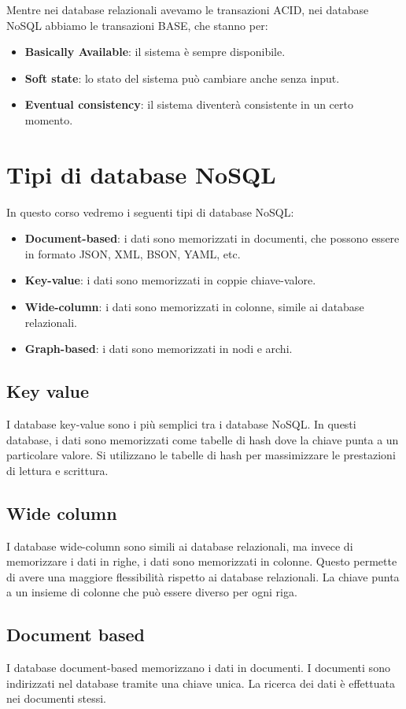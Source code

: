 Mentre nei database relazionali avevamo le transazioni ACID, nei database NoSQL
abbiamo le transazioni BASE, che stanno per:
\begin{itemize}
      \item \textbf{Basically Available}: il sistema è sempre disponibile.
      \item \textbf{Soft state}: lo stato del sistema può cambiare anche senza
            input.
      \item \textbf{Eventual consistency}: il sistema diventerà consistente in un
            certo momento.
\end{itemize}
\section{Tipi di database NoSQL}
In questo corso vedremo i seguenti tipi di database NoSQL:
\begin{itemize}
      \item \textbf{Document-based}: i dati sono memorizzati in documenti, che
            possono essere in formato JSON, XML, BSON, YAML, etc.
      \item \textbf{Key-value}: i dati sono memorizzati in coppie chiave-valore.
      \item \textbf{Wide-column}: i dati sono memorizzati in colonne, simile ai
            database relazionali.
      \item \textbf{Graph-based}: i dati sono memorizzati in nodi e archi.
\end{itemize}
\subsection{Key value}
I database key-value sono i più semplici tra i database NoSQL. In questi
database, i dati sono memorizzati come tabelle di hash dove la chiave punta a un
particolare valore. Si utilizzano le tabelle di hash per massimizzare le prestazioni
di lettura e scrittura.
\subsection{Wide column}
I database wide-column sono simili ai database relazionali, ma invece di
memorizzare i dati in righe, i dati sono memorizzati in colonne. Questo permette
di avere una maggiore flessibilità rispetto ai database relazionali. La chiave 
punta a un insieme di colonne che può essere diverso per ogni riga.
\subsection{Document based}
I database document-based memorizzano i dati in documenti. I documenti sono 
indirizzati nel database tramite una chiave unica. La ricerca dei dati è
effettuata nei documenti stessi.
